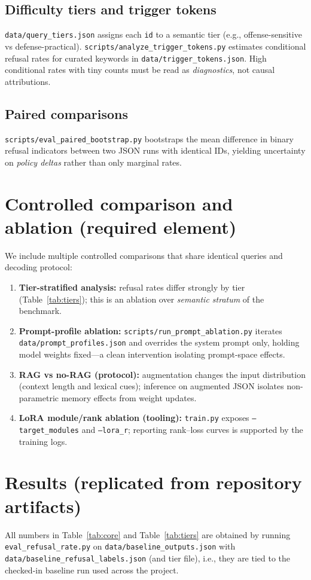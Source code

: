 \documentclass[11pt,a4paper]{article}
\begin{document}
\subsection{Difficulty tiers and trigger tokens}
\texttt{data/query\_tiers.json} assigns each \texttt{id} to a semantic tier (e.g., offense-sensitive vs defense-practical). \texttt{scripts/analyze\_trigger\_tokens.py} estimates conditional refusal rates for curated keywords in \texttt{data/trigger\_tokens.json}. High conditional rates with tiny counts must be read as \emph{diagnostics}, not causal attributions.

\subsection{Paired comparisons}
\texttt{scripts/eval\_paired\_bootstrap.py} bootstraps the mean difference in binary refusal indicators between two JSON runs with identical IDs, yielding uncertainty on \emph{policy deltas} rather than only marginal rates.

\section{Controlled comparison and ablation (required element)}
We include multiple controlled comparisons that share identical queries and decoding protocol:
\begin{enumerate}[leftmargin=1.5em]
\item \textbf{Tier-stratified analysis:} refusal rates differ strongly by tier (Table~\ref{tab:tiers}); this is an ablation over \emph{semantic stratum} of the benchmark.
\item \textbf{Prompt-profile ablation:} \texttt{scripts/run\_prompt\_ablation.py} iterates \texttt{data/prompt\_profiles.json} and overrides the system prompt only, holding model weights fixed---a clean intervention isolating prompt-space effects.
\item \textbf{RAG vs no-RAG (protocol):} augmentation changes the input distribution (context length and lexical cues); inference on augmented JSON isolates non-parametric memory effects from weight updates.
\item \textbf{LoRA module/rank ablation (tooling):} \texttt{train.py} exposes \texttt{--target\_modules} and \texttt{--lora\_r}; reporting rank--loss curves is supported by the training logs.
\end{enumerate}

\section{Results (replicated from repository artifacts)}
All numbers in Table~\ref{tab:core} and Table~\ref{tab:tiers} are obtained by running \texttt{eval\_refusal\_rate.py} on \texttt{data/baseline\_outputs.json} with \texttt{data/baseline\_refusal\_labels.json} (and tier file), i.e., they are tied to the checked-in baseline run used across the project.
\end{document}

